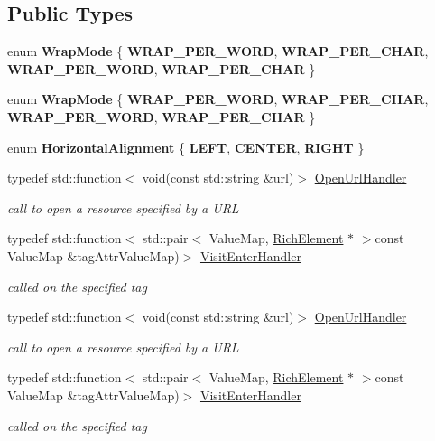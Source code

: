 \subsection*{Public Types}
\begin{DoxyCompactItemize}
\item 
\mbox{\label{classui_1_1RichText_a056976f10f3628a161e01044c08b9e0b}} 
enum {\bfseries Wrap\+Mode} \{ {\bfseries W\+R\+A\+P\+\_\+\+P\+E\+R\+\_\+\+W\+O\+RD}, 
{\bfseries W\+R\+A\+P\+\_\+\+P\+E\+R\+\_\+\+C\+H\+AR}, 
{\bfseries W\+R\+A\+P\+\_\+\+P\+E\+R\+\_\+\+W\+O\+RD}, 
{\bfseries W\+R\+A\+P\+\_\+\+P\+E\+R\+\_\+\+C\+H\+AR}
 \}
\item 
\mbox{\label{classui_1_1RichText_a056976f10f3628a161e01044c08b9e0b}} 
enum {\bfseries Wrap\+Mode} \{ {\bfseries W\+R\+A\+P\+\_\+\+P\+E\+R\+\_\+\+W\+O\+RD}, 
{\bfseries W\+R\+A\+P\+\_\+\+P\+E\+R\+\_\+\+C\+H\+AR}, 
{\bfseries W\+R\+A\+P\+\_\+\+P\+E\+R\+\_\+\+W\+O\+RD}, 
{\bfseries W\+R\+A\+P\+\_\+\+P\+E\+R\+\_\+\+C\+H\+AR}
 \}
\item 
\mbox{\label{classui_1_1RichText_a4f179a24ff9048ae07fd20d94c09e264}} 
enum {\bfseries Horizontal\+Alignment} \{ {\bfseries L\+E\+FT}, 
{\bfseries C\+E\+N\+T\+ER}, 
{\bfseries R\+I\+G\+HT}
 \}
\item 
typedef std\+::function$<$ void(const std\+::string \&url)$>$ \hyperlink{classui_1_1RichText_ad3631ae61d204f1d9576f5923bbd762e}{Open\+Url\+Handler}
\begin{DoxyCompactList}\small\item\em call to open a resource specified by a U\+RL \end{DoxyCompactList}\item 
typedef std\+::function$<$ std\+::pair$<$ Value\+Map, \hyperlink{classui_1_1RichElement}{Rich\+Element} $\ast$ $>$const Value\+Map \&tag\+Attr\+Value\+Map)$>$ \hyperlink{classui_1_1RichText_a195114ba2bddc97248b8a0c400d489f7}{Visit\+Enter\+Handler}
\begin{DoxyCompactList}\small\item\em called on the specified tag \end{DoxyCompactList}\item 
typedef std\+::function$<$ void(const std\+::string \&url)$>$ \hyperlink{classui_1_1RichText_ad3631ae61d204f1d9576f5923bbd762e}{Open\+Url\+Handler}
\begin{DoxyCompactList}\small\item\em call to open a resource specified by a U\+RL \end{DoxyCompactList}\item 
typedef std\+::function$<$ std\+::pair$<$ Value\+Map, \hyperlink{classui_1_1RichElement}{Rich\+Element} $\ast$ $>$const Value\+Map \&tag\+Attr\+Value\+Map)$>$ \hyperlink{classui_1_1RichText_a195114ba2bddc97248b8a0c400d489f7}{Visit\+Enter\+Handler}
\begin{DoxyCompactList}\small\item\em called on the specified tag \end{DoxyCompactList}\end{DoxyCompactItemize}
